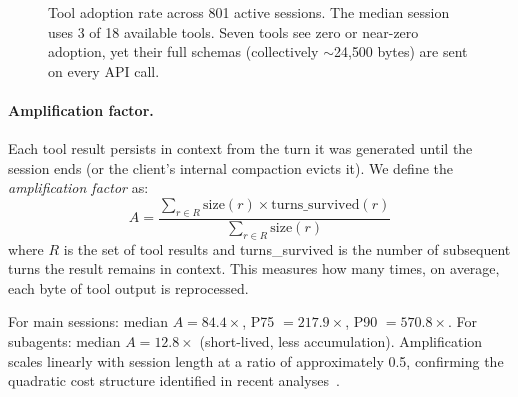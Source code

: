 \begin{figure}[ht]
\centering
{}
\caption{Tool adoption rate across 801 active sessions. The median
  session uses 3 of 18 available tools. Seven tools see zero or
  near-zero adoption, yet their full schemas (collectively
  $\sim$24{,}500 bytes) are sent on every API call.}
\label{fig:tool-adoption}
\end{figure}

\paragraph{Amplification factor.}
\label{sec:amplification}
Each tool result persists in context from the turn it was generated
until the session ends (or the client's internal compaction evicts
it). We define the \emph{amplification factor} as:
\[
  A = \frac{\sum_{r \in R} \text{size}(r) \times \text{turns\_survived}(r)}
           {\sum_{r \in R} \text{size}(r)}
\]
where $R$ is the set of tool results and turns\_survived is the
number of subsequent turns the result remains in context. This
measures how many times, on average, each byte of tool output is
reprocessed.

For main sessions: median $A = 84.4\times$, P75 $= 217.9\times$,
P90 $= 570.8\times$. For subagents: median $A = 12.8\times$
(short-lived, less accumulation). Amplification scales linearly
with session length at a ratio of approximately 0.5, confirming
the quadratic cost structure identified in recent
analyses~\citep{zeyliger2026quadratic}.

